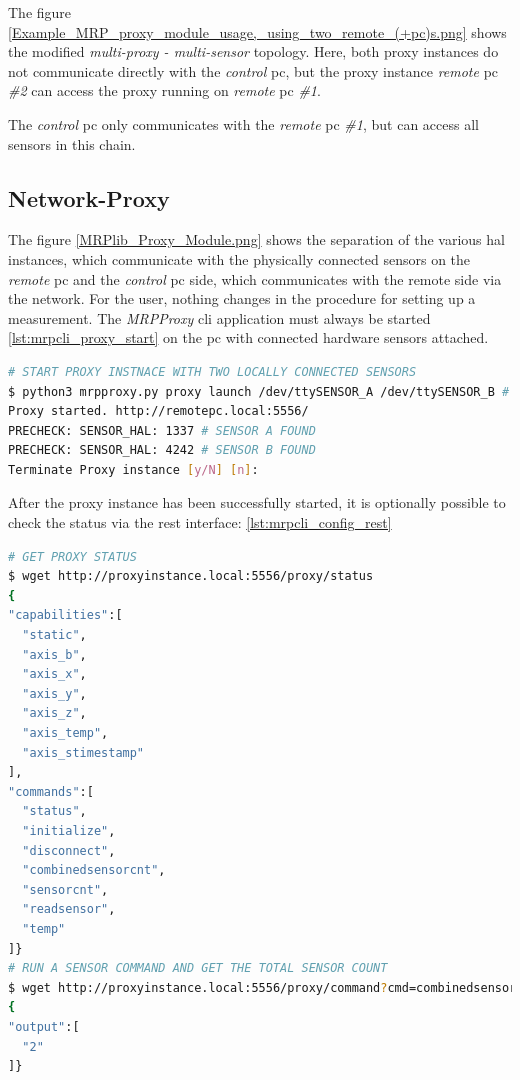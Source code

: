 The figure
\ref{Example_MRP_proxy_module_usage,_using_two_remote_(+pc)s.png} shows
the modified \emph{multi-proxy - multi-sensor} topology. Here, both
proxy instances do not communicate directly with the \emph{control}
\gls{pc}, but the proxy instance \emph{remote} \gls{pc} \emph{\#2} can
access the proxy running on \emph{remote} \gls{pc} \emph{\#1}.

The \emph{control} \gls{pc} only communicates with the \emph{remote}
\gls{pc} \emph{\#1}, but can access all sensors in this chain.

\hypertarget{network-proxy}{%
\subsection{Network-Proxy}\label{network-proxy}}

The figure \ref{MRPlib_Proxy_Module.png} shows the separation of the
various \gls{hal} instances, which communicate with the physically
connected sensors on the \emph{remote} \gls{pc} and the \emph{control}
\gls{pc} side, which communicates with the remote side via the network.
For the user, nothing changes in the procedure for setting up a
measurement. The \emph{MRPProxy} \gls{cli} application must always be
started \ref{lst:mrpcli_proxy_start} on the \gls{pc} with connected
hardware sensors attached.

\begin{lstlisting}[language=bash, caption={MRPproxy usage to enable local sensor usage over network}, label=lst:mrpcli_proxy_start]
# START PROXY INSTNACE WITH TWO LOCALLY CONNECTED SENSORS
$ python3 mrpproxy.py proxy launch /dev/ttySENSOR_A /dev/ttySENSOR_B # add another proxy instance http://proxyinstance_2.local for multi-sensor, multi-proxy chain
Proxy started. http://remotepc.local:5556/
PRECHECK: SENSOR_HAL: 1337 # SENSOR A FOUND
PRECHECK: SENSOR_HAL: 4242 # SENSOR B FOUND
Terminate Proxy instance [y/N] [n]: 
\end{lstlisting}

After the proxy instance has been successfully started, it is optionally
possible to check the status via the \gls{rest} interface:
\ref{lst:mrpcli_config_rest}

\begin{lstlisting}[language=bash, caption={MRPProxy REST endpoint query examples}, label=lst:mrpcli_config_rest]
# GET PROXY STATUS
$ wget http://proxyinstance.local:5556/proxy/status
{
"capabilities":[
  "static",
  "axis_b",
  "axis_x",
  "axis_y",
  "axis_z",
  "axis_temp",
  "axis_stimestamp"
],
"commands":[
  "status",
  "initialize",
  "disconnect",
  "combinedsensorcnt",
  "sensorcnt",
  "readsensor",
  "temp"
]}
# RUN A SENSOR COMMAND AND GET THE TOTAL SENSOR COUNT
$ wget http://proxyinstance.local:5556/proxy/command?cmd=combinedsensorcnt
{
"output":[
  "2"
]}
\end{lstlisting}

